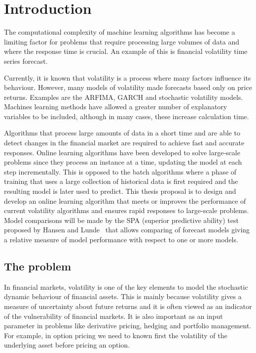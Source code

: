 \chapter{Introduction}


The computational complexity of machine learning algorithms has become a limiting factor for problems that require processing large volumes of data and where the response time is crucial. An example of this is financial volatility time series forecast. 

Currently, it is known that volatility is a process where many factors influence its behaviour. However, many models of volatility made forecasts based only on price returns. Examples are the ARFIMA, GARCH and stochastic volatility models. Machines learning methods have allowed a greater number of explanatory variables to be included, although in many cases, these increase calculation time. 

Algorithms that process large amounts of data in a short time and are able to detect changes in the financial market are required to achieve fast and accurate responses. Online learning algorithms have been developed to solve large-scale problems since they process an instance at a time, updating the model at each step incrementally. This is opposed to the batch algorithms where a phase of training that uses a large collection of historical data is first required and the resulting model is later used to predict. 
This thesis proposal is to design and develop an online learning algorithm that meets or improves the performance of current volatility algorithms and ensures rapid responses to large-scale problems. Model comparisons will be made by the SPA (superior predictive ability) test proposed by Hansen and
Lunde~\cite{hansen+lunde2006}  that allows comparing of forecast models giving a relative measure of model performance with respect to one or more models.


\section{The problem}

In financial markets, volatility is one of the key elements to model the stochastic dynamic behaviour of financial assets. This is mainly because volatility gives a measure of uncertainty about future returns and it is often viewed as an indicator of the vulnerability of financial markets. It is also important as an input parameter in problems like derivative pricing, hedging and portfolio management. For example, in option pricing we need to known first the volatility of the underlying asset before pricing an option. 


